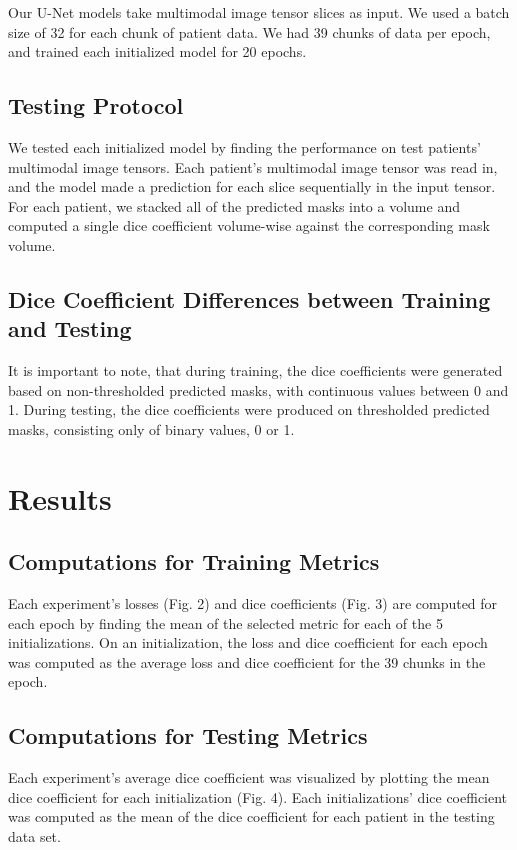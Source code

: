 \documentclass[conference]{IEEEtran}
\begin{document}
Our U-Net models take multimodal image tensor slices as input. We used a batch size of 32 for each chunk of patient data. We had 39 chunks of data per epoch, and trained each initialized model for 20 epochs.

\subsection{Testing Protocol}
We tested each initialized model by finding the performance on test patients’ multimodal image tensors. Each patient’s multimodal image tensor was read in, and the model made a prediction for each slice sequentially in the input tensor. For each patient, we stacked all of the predicted masks into a volume and computed a single dice coefficient volume-wise against the corresponding mask volume. 

\subsection{Dice Coefficient Differences between Training and Testing}
It is important to note, that during training, the dice coefficients were generated based on non-thresholded predicted masks, with continuous values between 0 and 1. During testing, the dice coefficients were produced on thresholded predicted masks, consisting only of binary values, 0 or 1.

\section{Results}

\subsection{Computations for Training Metrics}

Each experiment's losses (Fig. 2) and dice coefficients (Fig. 3) are computed for each epoch by finding the mean of the selected metric for each of the 5 initializations. On an initialization, the loss and dice coefficient for each epoch was computed as the average loss and dice coefficient for the 39 chunks in the epoch.

\subsection{Computations for Testing Metrics}

Each experiment's average dice coefficient was visualized by plotting the mean dice coefficient for each initialization (Fig. 4). Each initializations' dice coefficient was computed as the mean of the dice coefficient for each patient in the testing data set.   
\end{document}
